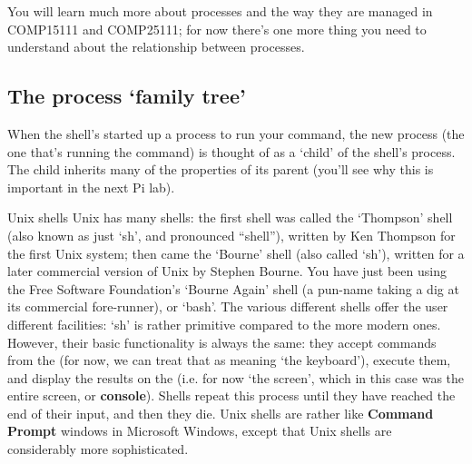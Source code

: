 You will learn much more about processes and the way they are managed in COMP15111 and COMP25111; for now there's one more thing you need to understand about the relationship between processes.

\subsection{The process `family tree'}
\label{section:family-tree}

When the shell's started up a process to run your command, the new process (the one that's running the command) is thought of as a `child' of the shell's process. The child inherits many of the properties of its parent (you'll see why this is important in the next Pi lab).



\begin{diversion}{Unix shells}
Unix has many shells: the first shell was called the `Thompson' shell (also known as just `sh', and pronounced ``shell''), written by Ken Thompson for the first Unix system; then came the `Bourne' shell (also called `sh'), written for a later commercial version of Unix by Stephen Bourne. You have just been using the Free Software Foundation's `Bourne Again' shell (a pun-name taking a dig at its commercial fore-runner), or `bash'. The various different shells offer the user different facilities: `sh' is rather
primitive compared to the more modern ones. However, their basic
functionality is always the same: they accept commands from the
 (for now, we can treat that as meaning `the keyboard'), execute them, and display
the results on the  (i.e. for now `the screen', which in
this case was the entire screen, or \textbf{console}). Shells repeat
this process until they have reached the end of their input, and then
they die. Unix shells are rather like \textbf{Command Prompt} windows in Microsoft
Windows, except that Unix shells are considerably more sophisticated.
\end{diversion}



